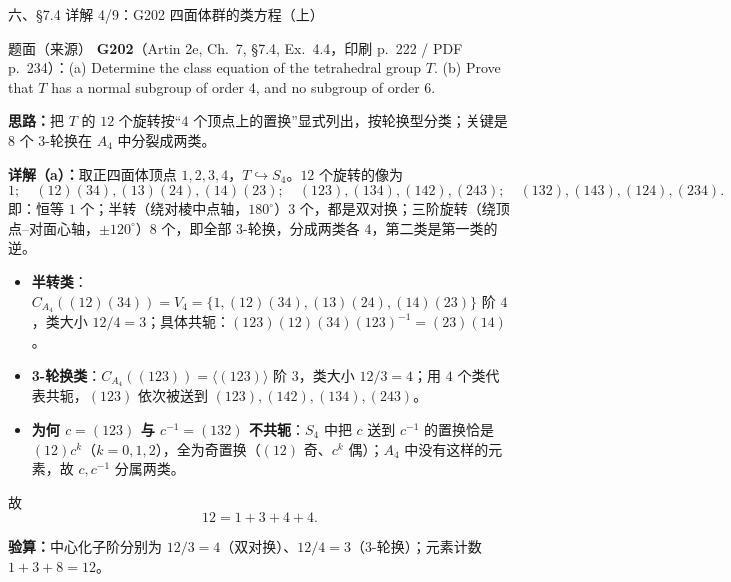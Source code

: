 \documentclass[aspectratio=169,10pt,fontset=none]{ctexbeamer}
\newcommand{\ex}[1]{\textcolor{accent}{\footnotesize\bfseries #1}}
\newcommand{\key}[1]{\textcolor{ink}{\bfseries #1}}
\begin{document}
\begin{frame}[t]{六、\S7.4 详解 4/9：G202 四面体群的类方程（上）}
\label{ex:G202}
\scriptsize
\begin{block}{\footnotesize 题面（来源）}
\ex{G202}（Artin 2e, Ch.~7, \S7.4, Ex.~4.4，印刷 p.~222 / PDF p.~234）：(a) Determine the class equation of the tetrahedral group $T$. (b) Prove that $T$ has a normal subgroup of order $4$, and no subgroup of order $6$.
\end{block}
\key{思路：}把 $T$ 的 $12$ 个旋转按“$4$ 个顶点上的置换”显式列出，按轮换型分类；关键是 $8$ 个 3-轮换在 $A_4$ 中分裂成两类。

\key{详解（a）：}取正四面体顶点 $1,2,3,4$，$T\hookrightarrow S_4$。$12$ 个旋转的像为
\[
1;\quad (12)(34),(13)(24),(14)(23);\quad (123),(134),(142),(243);\quad (132),(143),(124),(234).
\]
即：恒等 $1$ 个；半转（绕对棱中点轴，$180^\circ$）$3$ 个，都是双对换；三阶旋转（绕顶点--对面心轴，$\pm120^\circ$）$8$ 个，即全部 3-轮换，分成两类各 $4$，第二类是第一类的逆。
\begin{itemize}\setlength{\itemsep}{1pt}
\item \textbf{半转类}：$C_{A_4}((12)(34))=V_4=\{1,(12)(34),(13)(24),(14)(23)\}$ 阶 $4$，类大小 $12/4=3$；具体共轭：$(123)(12)(34)(123)^{-1}=(23)(14)$。
\item \textbf{3-轮换类}：$C_{A_4}((123))=\langle(123)\rangle$ 阶 $3$，类大小 $12/3=4$；用 $4$ 个类代表共轭，$(123)$ 依次被送到 $(123),(142),(134),(243)$。
\item \textbf{为何 $c=(123)$ 与 $c^{-1}=(132)$ 不共轭}：$S_4$ 中把 $c$ 送到 $c^{-1}$ 的置换恰是 $(12)c^k$（$k=0,1,2$），全为奇置换（$(12)$ 奇、$c^k$ 偶）；$A_4$ 中没有这样的元素，故 $c,c^{-1}$ 分属两类。
\end{itemize}
故 \[12=1+3+4+4.\]

\key{验算：}中心化子阶分别为 $12/3=4$（双对换）、$12/4=3$（3-轮换）；元素计数 $1+3+8=12$。
\end{frame}
\end{document}
